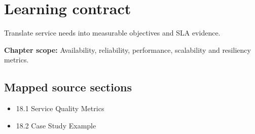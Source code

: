 \documentclass[10pt,letterpaper]{article}
\begin{document}
\sourceStatement
\tableofcontents
\newpage
\section{Learning contract}
\begin{takeaway}
Translate service needs into measurable objectives and SLA evidence.
\end{takeaway}
\textbf{Chapter scope:} Availability, reliability, performance, scalability and resiliency metrics.\\
\subsection{Mapped source sections}
\begin{itemize}
\item 18.1 Service Quality Metrics
\item 18.2 Case Study Example
\end{itemize}
\end{document}

